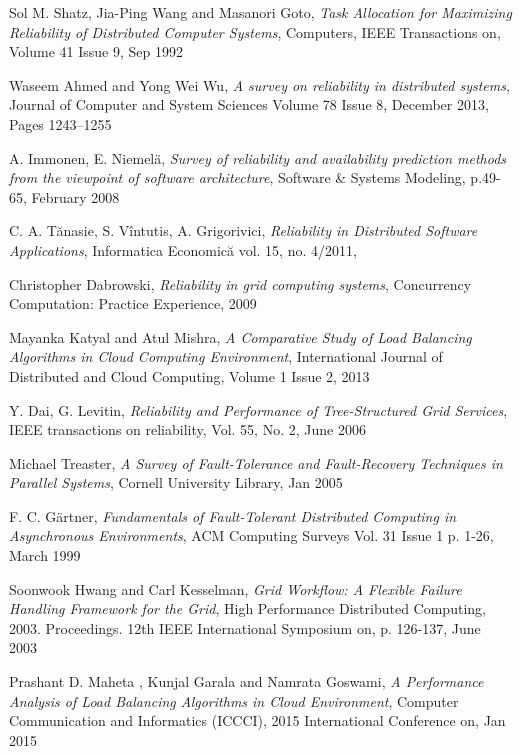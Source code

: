 \documentclass{cslthse-msc}
\begin{document}
\begin{thebibliography}{50}

	Sol M. Shatz, Jia-Ping Wang and Masanori Goto,
	\emph{Task Allocation for Maximizing Reliability of Distributed Computer Systems},
	Computers, IEEE Transactions on, Volume 41  Issue 9,
	Sep 1992
	
	Waseem Ahmed and Yong Wei Wu,
	\emph{A survey on reliability in distributed systems},
	Journal of Computer and System Sciences Volume 78 Issue 8,
	December 2013, Pages 1243–1255
	
	A. Immonen, E. Niemelä,
	\emph{Survey of reliability and availability prediction methods from the viewpoint of software architecture},
	Software \& Systems Modeling, p.49-65,
	February 2008

	C. A. Tănasie, S. Vîntutis, A. Grigorivici,
	\emph{Reliability in Distributed Software Applications},
	Informatica Economică vol. 15, no. 4/2011,

	Christopher Dabrowski,
	\emph{Reliability in grid computing systems},
	Concurrency Computation: Practice Experience,
	2009

	Mayanka Katyal and Atul Mishra,
	\emph{A Comparative Study of Load Balancing Algorithms in Cloud Computing Environment},
	International Journal of Distributed and Cloud Computing, Volume 1 Issue 2,
	2013
	
	Y. Dai, G. Levitin,
	\emph{Reliability and Performance of Tree-Structured Grid Services},
	IEEE transactions on reliability, Vol. 55, No. 2, 
	June 2006

	Michael Treaster,
	\emph{A Survey of Fault-Tolerance and Fault-Recovery Techniques in Parallel Systems},
	Cornell University Library,
	Jan 2005

	F. C. Gärtner,
	\emph{Fundamentals of Fault-Tolerant Distributed Computing in Asynchronous Environments},
	ACM Computing Surveys Vol. 31 Issue 1 p. 1-26, 
	March 1999 

	Soonwook Hwang and Carl Kesselman,
	\emph{Grid Workflow: A Flexible Failure Handling Framework for the Grid},
	High Performance Distributed Computing, 2003. Proceedings. 12th IEEE International Symposium on, p. 	126-137, 
	June 2003

	Prashant D. Maheta , Kunjal Garala and Namrata Goswami,
	\emph{A Performance Analysis of Load Balancing Algorithms in Cloud Environment},
	Computer Communication and Informatics (ICCCI), 2015 International Conference on,
	Jan 2015
	

\end{thebibliography}
\end{document}
